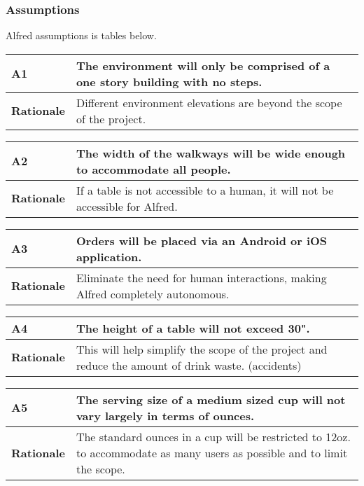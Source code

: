 \documentclass [11pt]{article}
\begin{document}
\subsubsection{Assumptions}
Alfred assumptions is tables below. 
\begin{longtable}{| p{ } | p{ } | }\hline 
\rowcolor{tableCell}\textbf{A1} & The environment will only be comprised of a one story building with no steps. \\ \hline
\textbf{Rationale} & Different environment elevations are beyond the scope of the project. \\ \hline 
\end{longtable}

\begin{longtable}{| p{ } | p{ } | }\hline 
\rowcolor{tableCell}\textbf{A2} & The width of the walkways will be wide enough to accommodate all people. \\ \hline
\textbf{Rationale} &  If a table is not accessible to a human, it will not be accessible for Alfred.\\ \hline
\end{longtable}

\begin{longtable}{| p{ } | p{ } | }\hline 
\rowcolor{tableCell}\textbf{A3} & Orders will be placed via an Android or iOS application. \\ \hline
\textbf{Rationale} &  Eliminate the need for human interactions, making Alfred completely autonomous. \\ \hline
\end{longtable}

\begin{longtable}{| p{ } | p{ } | }\hline 
\rowcolor{tableCell}\textbf{A4} & The height of a table will not exceed 30". \\ \hline
\textbf{Rationale} &  This will help simplify the scope of the project and reduce the amount of drink waste. (accidents)\\ \hline
\end{longtable}

\begin{longtable}{| p{ } | p{ } | }\hline 
\rowcolor{tableCell}\textbf{A5} & The serving size of a medium sized cup will not vary largely in terms of ounces. \\ \hline
\textbf{Rationale} &  The standard ounces in a cup will be restricted to 12oz. to accommodate as many users as possible and to limit the scope. \\ \hline
\end{longtable}
\end{document}
